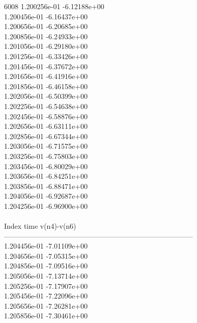 6008	1.200256e-01	-6.12188e+00	\\ 	1.200456e-01	-6.16437e+00	\\ 	1.200656e-01	-6.20685e+00	\\ 	1.200856e-01	-6.24933e+00	\\ 	1.201056e-01	-6.29180e+00	\\ 	1.201256e-01	-6.33426e+00	\\ 	1.201456e-01	-6.37672e+00	\\ 	1.201656e-01	-6.41916e+00	\\ 	1.201856e-01	-6.46158e+00	\\ 	1.202056e-01	-6.50399e+00	\\ 	1.202256e-01	-6.54638e+00	\\ 	1.202456e-01	-6.58876e+00	\\ 	1.202656e-01	-6.63111e+00	\\ 	1.202856e-01	-6.67344e+00	\\ 	1.203056e-01	-6.71575e+00	\\ 	1.203256e-01	-6.75803e+00	\\ 	1.203456e-01	-6.80029e+00	\\ 	1.203656e-01	-6.84251e+00	\\ 	1.203856e-01	-6.88471e+00	\\ 	1.204056e-01	-6.92687e+00	\\ 	1.204256e-01	-6.96900e+00	\\ \hline
\\ \hline
Index   time            v(n4)-v(n6)     \\ \hline
--------------------------------------------------------------------------------\\ 	1.204456e-01	-7.01109e+00	\\ 	1.204656e-01	-7.05315e+00	\\ 	1.204856e-01	-7.09516e+00	\\ 	1.205056e-01	-7.13714e+00	\\ 	1.205256e-01	-7.17907e+00	\\ 	1.205456e-01	-7.22096e+00	\\ 	1.205656e-01	-7.26281e+00	\\ 	1.205856e-01	-7.30461e+00	\\ \hline
